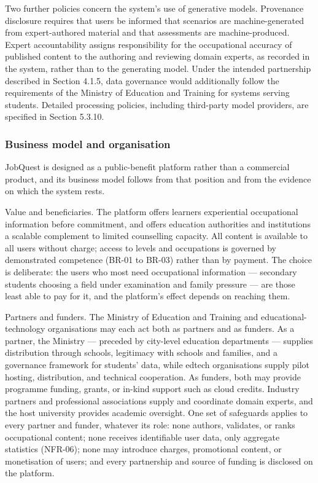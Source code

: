 Two further policies concern the system's use of generative models. Provenance disclosure requires that users be informed that scenarios are machine-generated from expert-authored material and that assessments are machine-produced. Expert accountability assigns responsibility for the occupational accuracy of published content to the authoring and reviewing domain experts, as recorded in the system, rather than to the generating model. Under the intended partnership described in Section 4.1.5, data governance would additionally follow the requirements of the Ministry of Education and Training for systems serving students. Detailed processing policies, including third-party model providers, are specified in Section 5.3.10.

\subsubsection{Business model and organisation}

JobQuest is designed as a public-benefit platform rather than a commercial product, and its business model follows from that position and from the evidence on which the system rests.

Value and beneficiaries. The platform offers learners experiential occupational information before commitment, and offers education authorities and institutions a scalable complement to limited counselling capacity. All content is available to all users without charge; access to levels and occupations is governed by demonstrated competence (BR-01 to BR-03) rather than by payment. The choice is deliberate: the users who most need occupational information --- secondary students choosing a field under examination and family pressure --- are those least able to pay for it, and the platform's effect depends on reaching them.

Partners and funders. The Ministry of Education and Training and educational-technology organisations may each act both as partners and as funders. As a partner, the Ministry --- preceded by city-level education departments --- supplies distribution through schools, legitimacy with schools and families, and a governance framework for students' data, while edtech organisations supply pilot hosting, distribution, and technical cooperation. As funders, both may provide programme funding, grants, or in-kind support such as cloud credits. Industry partners and professional associations supply and coordinate domain experts, and the host university provides academic oversight. One set of safeguards applies to every partner and funder, whatever its role: none authors, validates, or ranks occupational content; none receives identifiable user data, only aggregate statistics (NFR-06); none may introduce charges, promotional content, or monetisation of users; and every partnership and source of funding is disclosed on the platform.

